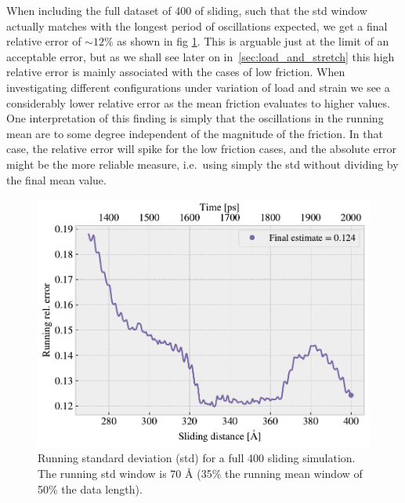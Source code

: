 %
%
%
%

When including the full dataset of \SI{400}{} of sliding, such that the \acrshort{std} window actually matches with the longest period of oscillations expected, we get a final relative error of $\sim 12 \%$ as shown in fig \cref{fig:runstd_long}. This is arguable just at the limit of an acceptable error, but as we shall see later on in~\cref{sec:load_and_stretch} this high relative error is mainly associated with the cases of low friction. When investigating different configurations under variation of load and strain we see a considerably lower relative error as the mean friction evaluates to higher values. One interpretation of this finding is simply that the oscillations in the running mean are to some degree independent of the magnitude of the friction. In that case, the relative error will spike for the low friction cases, and the absolute error might be the more reliable measure, i.e.\ using simply the \acrshort{std} without dividing by the final mean value.


\begin{figure}[H]
  \centering
  \includegraphics[width=0.6\linewidth]{figures/baseline/Ff_runstd_long.pdf}
  \caption{Running standard deviation (std) for a full \SI{400}{{}} sliding simulation. The running std window is 70 Å (35\% the running mean window of 50\% the data length).}
  \label{fig:runstd_long}
\end{figure}


